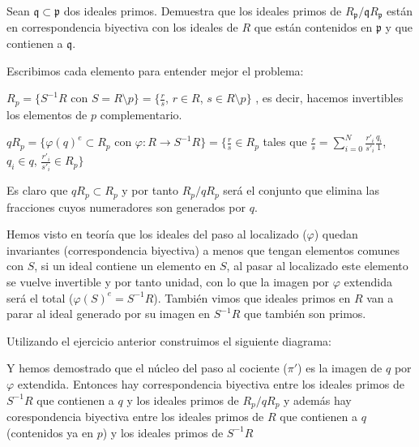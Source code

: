 \begin{problem}
	Sean $\mathfrak{q}\subset \mathfrak{p}$ dos ideales primos. Demuestra que los ideales primos de $R_\mathfrak{p}/\mathfrak{q}R_\mathfrak{p}$ están en correspondencia biyectiva con los ideales de $R$ que están contenidos en $\mathfrak{p}$ y que contienen a $\mathfrak{q}$.


	\solution

	Escribimos cada elemento para entender mejor el problema:

	$R_p = \{S^{-1}R $ con $ S=R \setminus p \} = \{\frac{r}{s}$, $r \in R$, $s \in R\setminus p \}$ , es decir, hacemos invertibles los elementos de $p$ complementario.

	$qR_p = \{ \varphi(q)^e\subset R_p$ con $\varphi : R \rightarrow S^{-1}R\} = \{\frac{r}{s} \in R_p$ tales que $\frac{r}{s} = \sum^N_{i=0} \frac{r'_i}{s'_i} \frac{q_i}{1}$, $q_i\in q$, $\frac{r'_i}{s'_i}\in R_p\}$

	Es claro que $qR_p \subset R_p$ y por tanto $R_p/qR_p$ será el conjunto que elimina las fracciones cuyos numeradores son generados por $q$.

	Hemos visto en teoría que los ideales del paso al localizado ($\varphi$) quedan invariantes (correspondencia biyectiva) a menos que tengan elementos comunes con $S$, si un ideal contiene un elemento en $S$, al pasar al localizado este elemento se vuelve invertible y por tanto unidad, con lo que la imagen por $\varphi$ extendida será el total ($\varphi(S)^e = S^{-1}R$). También vimos que ideales primos en $R$ van a parar al ideal generado por su imagen en $S^{-1}R$ que también son primos.

	Utilizando el ejercicio anterior construimos el siguiente diagrama:


	Y hemos demostrado que el núcleo del paso al cociente ($\pi '$) es la imagen de $q$ por $\varphi$ extendida. Entonces hay correspondencia biyectiva entre los ideales primos de $S^{-1}R$ que contienen a $q$ y los ideales primos de $R_p/qR_p$ y además hay corespondencia biyectiva entre los ideales primos de $R$ que contienen a $q$ (contenidos ya en $p$) y los ideales primos de $S^{-1}R$

\end{problem}

